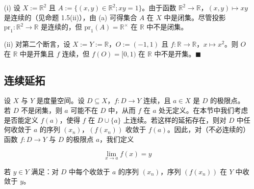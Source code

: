 \begin{example}
\begin{items}
\proofhead
(i) 设 $X := \mathbb{R}^2$ 且 $A := \{(x, y) \in \mathbb{R}^2 ; xy = 1\}$。由于函数 $\mathbb{R}^2 \to \mathbb{R}$，$(x, y) \mapsto xy$ 是连续的（见命题 1.5(ii)），由 (a) 可得集合 $A$ 在 $X$ 中是闭集。尽管投影 $\mathrm{pr}_1 : \mathbb{R}^2 \to \mathbb{R}$ 是连续的，但 $\mathrm{pr}_1(A) = \mathbb{R}^{\times}$ 在 $\mathbb{R}$ 中不是闭集。
\end{items}

(ii) 对第二个断言，设 $ X := Y := \mathbb{R} $，$ O := (-1,1) $ 且 $ f: \mathbb{R} \to \mathbb{R} $，$ x \mapsto x^2 $。则 $ O $ 在 $ \mathbb{R} $ 中是开集且 $ f $ 连续，但 $ f(O) = [0,1) $ 在 $ \mathbb{R} $ 中不是开集。$ \blacksquare $

\end{example}

\subsection*{连续延拓}

设 $X$ 与 $Y$ 是度量空间。设 $D \subseteq X$，$f: D \to Y$ 连续，且 $a \in X$ 是 $D$ 的极限点。若 $D$ 不是闭集，则 $a$ 可能不在 $D$ 中，从而 $f$ 在 $a$ 处无定义。在本节中我们考虑是否能定义 $f(a)$，使得 $f$ 在 $D \cup \{a\}$ 上连续。若这样的延拓存在，则对 $D$ 中任何收敛于 $a$ 的序列 $(x_n)$，$(f(x_n))$ 收敛于 $f(a)$。因此，对（不必连续的）函数 $f: D \to Y$ 与 $D$ 的极限点 $a$，我们定义

\begin{equation}
\lim_{x\to a}f(x)=y
\end{equation}

若 $y \in Y$ 满足：对 $D$ 中每个收敛于 $a$ 的序列 $(x_n)$，序列 $(f(x_n))$ 在 $Y$ 中收敛于 $y$。

